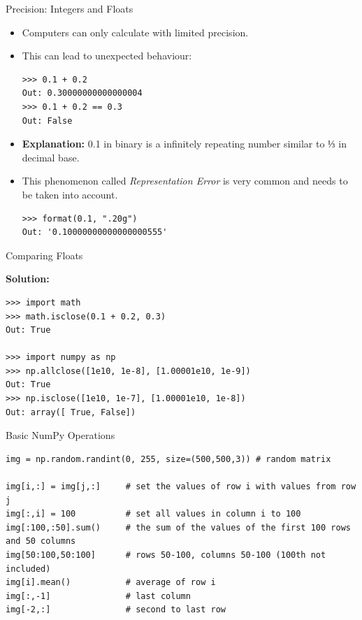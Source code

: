 \documentclass[compress%
,aspectratio=169%
]{beamer}
\begin{document}
\begin{frame}[fragile]{Precision: Integers and Floats}

\begin{itemize}
    \item Computers can only calculate with limited precision.
    \item This can lead to unexpected behaviour:
\begin{lstlisting}
>>> 0.1 + 0.2
Out: 0.30000000000000004
>>> 0.1 + 0.2 == 0.3
Out: False
\end{lstlisting}
\end{itemize}

\begin{itemize}
    \item \textbf{Explanation:} 0.1 in binary is a infinitely repeating number similar to ⅓ in decimal base.
    \item This phenomenon called \textit{Representation Error} is very common and needs to be taken into account.
\begin{lstlisting}
>>> format(0.1, ".20g")
Out: '0.10000000000000000555'
\end{lstlisting}    
\end{itemize}

\end{frame}

\begin{frame}[fragile]{Comparing Floats}
    
\textbf{Solution:}
\begin{lstlisting}
>>> import math
>>> math.isclose(0.1 + 0.2, 0.3)
Out: True

>>> import numpy as np
>>> np.allclose([1e10, 1e-8], [1.00001e10, 1e-9])
Out: True
>>> np.isclose([1e10, 1e-7], [1.00001e10, 1e-8])
Out: array([ True, False])
\end{lstlisting}



\end{frame}

\begin{frame}[fragile]{Basic NumPy Operations}
\begin{lstlisting}
img = np.random.randint(0, 255, size=(500,500,3)) # random matrix

img[i,:] = img[j,:]     # set the values of row i with values from row j
img[:,i] = 100          # set all values in column i to 100
img[:100,:50].sum()     # the sum of the values of the first 100 rows and 50 columns
img[50:100,50:100]      # rows 50-100, columns 50-100 (100th not included)
img[i].mean()           # average of row i
img[:,-1]               # last column
img[-2,:]               # second to last row

\end{lstlisting}
\end{frame}
\end{document}
